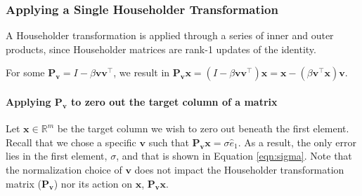 \documentclass[review,onefignum,onetabnum]{siamart190516}
\newcommand{\R}{\mathbb{R}}
\newcommand{\bb}[1]{\mathbf{#1}}
\begin{document}

\subsubsection{Applying a Single Householder Transformation}
A Householder transformation is applied through a series of inner and outer products, since Householder matrices are rank-1 updates of the identity. 

For some $\bb{P}_{\bb{v}}=I-\beta \bb{v}\bb{v}^{\top}$, we result in $\bb{P}_{\bb{v}} \bb{x} = (I-\beta \bb{v}\bb{v}^{\top})\bb{x} = \bb{x} - (\beta \bb{v}^{\top}\bb{x})\bb{v}$.
\paragraph{Applying $\bb{P}_{\bb{v}}$ to zero out the target column of a matrix}
Let $\bb{x}\in\R^{m}$ be the target column we wish to zero out beneath the first element.
Recall that we chose a specific $\bb{v}$ such that $\bb{P}_{\bb{v}}\bb{x} = \sigma \hat{e}_1$. 
As a result, the only error lies in the first element, $\sigma$, and that is shown in Equation \ref{eqn:sigma}.
Note that the normalization choice of $\bb{v}$ does not impact the Householder transformation matrix ($\bb{P}_{\bb{v}}$) nor its action on $\bb{x}$, $\bb{P}_{\bb{v}}\bb{x}$.
\end{document}
